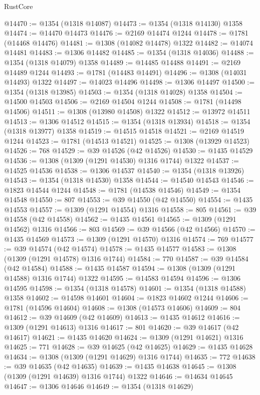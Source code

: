 \begin{lexlean}{RustCore}
\begin{coremodule}
@14470 := @1354 (@1318 @14087)
@14473 := @1354 (@1318 @14130) @1358
@14474 := @14470 @14473
@14476 := @2169 @14474 @1244
@14478 := @1781 (@14468 @14476)
@14481 := @1308 (@14082 @14478) @1322
@14482 := @14074 @14481
@14483 := @1306 @14482
@14485 := @1354 (@1318 @14036)
@14488 := @1354 (@1318 @14079) @1358
@14489 := @14485 @14488
@14491 := @2169 @14489 @1244
@14493 := @1781 (@14483 @14491)
@14496 := @1308 (@14031 @14493) @1322
@14497 := @14023 @14496
@14498 := @1306 @14497
@14500 := @1354 (@1318 @13985)
@14503 := @1354 (@1318 @14028) @1358
@14504 := @14500 @14503
@14506 := @2169 @14504 @1244
@14508 := @1781 (@14498 @14506)
@14511 := @1308 (@13980 @14508) @1322
@14512 := @13972 @14511
@14513 := @1306 @14512
@14515 := @1354 (@1318 @13934)
@14518 := @1354 (@1318 @13977) @1358
@14519 := @14515 @14518
@14521 := @2169 @14519 @1244
@14523 := @1781 (@14513 @14521)
@14525 := @1308 (@13929 @14523)
@14526 := 768
@14529 := @39 @14526 (@42 @14526)
@14530 := @1435 @14529
@14536 := @1308 (@1309 (@1291 @14530) @1316 @1744) @1322
@14537 := @14525 @14536
@14538 := @1306 @14537
@14540 := @1354 (@1318 @13926)
@14543 := @1354 (@1318 @14530) @1358
@14544 := @14540 @14543
@14546 := @1823 @14544 @1244
@14548 := @1781 (@14538 @14546)
@14549 := @1354 @14548
@14550 := 807
@14553 := @39 @14550 (@42 @14550)
@14554 := @1435 @14553
@14557 := @1309 (@1291 @14554) @1316
@14558 := 805
@14561 := @39 @14558 (@42 @14558)
@14562 := @1435 @14561
@14565 := @1309 (@1291 @14562) @1316
@14566 := 803
@14569 := @39 @14566 (@42 @14566)
@14570 := @1435 @14569
@14573 := @1309 (@1291 @14570) @1316
@14574 := 769
@14577 := @39 @14574 (@42 @14574)
@14578 := @1435 @14577
@14583 := @1308 (@1309 (@1291 @14578) @1316 @1744)
@14584 := 770
@14587 := @39 @14584 (@42 @14584)
@14588 := @1435 @14587
@14594 := @1308 (@1309 (@1291 @14588) @1316 @1744) @1322
@14595 := @14583 @14594
@14596 := @1306 @14595
@14598 := @1354 (@1318 @14578)
@14601 := @1354 (@1318 @14588) @1358
@14602 := @14598 @14601
@14604 := @1823 @14602 @1244
@14606 := @1781 (@14596 @14604)
@14608 := @1308 (@14573 @14606)
@14609 := 804
@14612 := @39 @14609 (@42 @14609)
@14613 := @1435 @14612
@14616 := @1309 (@1291 @14613) @1316
@14617 := 801
@14620 := @39 @14617 (@42 @14617)
@14621 := @1435 @14620
@14624 := @1309 (@1291 @14621) @1316
@14625 := 771
@14628 := @39 @14625 (@42 @14625)
@14629 := @1435 @14628
@14634 := @1308 (@1309 (@1291 @14629) @1316 @1744)
@14635 := 772
@14638 := @39 @14635 (@42 @14635)
@14639 := @1435 @14638
@14645 := @1308 (@1309 (@1291 @14639) @1316 @1744) @1322
@14646 := @14634 @14645
@14647 := @1306 @14646
@14649 := @1354 (@1318 @14629)

\end{coremodule}
\end{lexlean}
